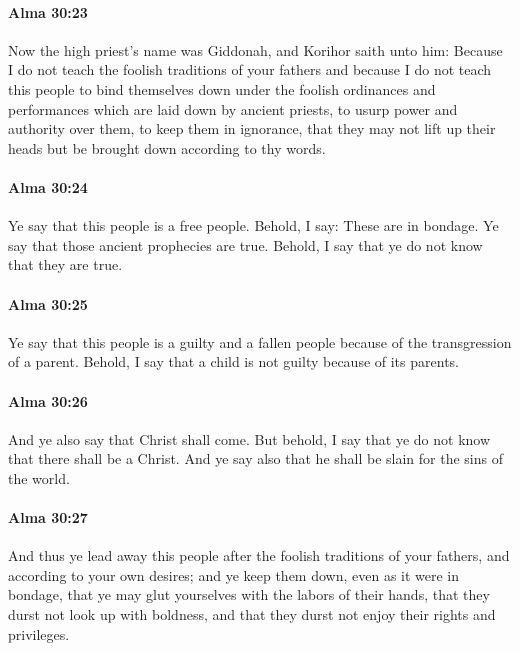 		\paragraph{Alma 30:23} %
			\label{ALMA-30-23}

			Now the high priest's name was Giddonah,
			and Korihor saith unto him:
			Because I do not teach the foolish traditions of your fathers
			and because I do not teach this people to bind themselves down
			under the foolish ordinances and performances
			which are laid down by ancient priests,
			to usurp power and authority over them,
			to keep them in ignorance,
			that they may not lift up their heads
			but be brought down according to thy words.

		\paragraph{Alma 30:24} %
			\label{ALMA-30-24}

			Ye say that this people is a free people.
			Behold, I say: These are in bondage.
			Ye say that those ancient prophecies are true.
			Behold, I say that ye do not know that they are true.

		\paragraph{Alma 30:25} %
			\label{ALMA-30-25}

			Ye say that this people is a guilty and a fallen people
			because of the transgression of a parent.
			Behold, I say that a child is not guilty because of its parents.

		\paragraph{Alma 30:26} %
			\label{ALMA-30-26}

			And ye also say that Christ shall come.
			But behold, I say that ye do not know that there shall be a Christ.
			And ye say also that he shall be slain for the sins of the world.

		\paragraph{Alma 30:27} %
			\label{ALMA-30-27}

			And thus ye lead away this people after the foolish traditions of your fathers,
			and according to your own desires;
			and ye keep them down, even as it were in bondage,
			that ye may glut yourselves with the labors of their hands,
			that they durst not look up with boldness,
			and that they durst not enjoy their rights and privileges.

